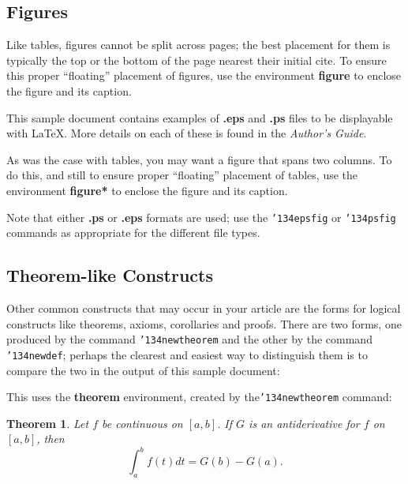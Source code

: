 \documentclass{acm_proc_article-sp}
\begin{document}
\subsection{Figures}
Like tables, figures cannot be split across pages; the
best placement for them
is typically the top or the bottom of the page nearest
their initial cite.  To ensure this proper ``floating'' placement
of figures, use the environment
\textbf{figure} to enclose the figure and its caption.

This sample document contains examples of \textbf{.eps}
and \textbf{.ps} files to be displayable with \LaTeX.  More
details on each of these is found in the \textit{Author's Guide}.

%
%


As was the case with tables, you may want a figure
that spans two columns.  To do this, and still to
ensure proper ``floating'' placement of tables, use the environment
\textbf{figure*} to enclose the figure and its caption.

Note that either {\textbf{.ps}} or {\textbf{.eps}} formats are
used; use
the \texttt{{\char'134}epsfig} or \texttt{{\char'134}psfig}
commands as appropriate for the different file types.

\subsection{Theorem-like Constructs}
Other common constructs that may occur in your article are
the forms for logical constructs like theorems, axioms,
corollaries and proofs.  There are
two forms, one produced by the
command \texttt{{\char'134}newtheorem} and the
other by the command \texttt{{\char'134}newdef}; perhaps
the clearest and easiest way to distinguish them is
to compare the two in the output of this sample document:

This uses the \textbf{theorem} environment, created by
the\linebreak\texttt{{\char'134}newtheorem} command:
\newtheorem{theorem}{Theorem}
\begin{theorem}
Let $f$ be continuous on $[a,b]$.  If $G$ is
an antiderivative for $f$ on $[a,b]$, then
\begin{displaymath}\int^b_af(t)dt = G(b) - G(a).\end{displaymath}
\end{theorem}
\end{document}
